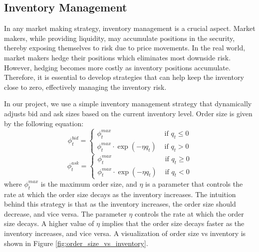 \documentclass[letterpaper, 10 pt, conference]{ieeeconf}  %
\begin{document}
\subsection{Inventory Management}

In any market making strategy, inventory management is a crucial aspect. Market makers, while providing liquidity, may accumulate positions in the security, thereby exposing themselves to risk due to price movements. In the real world, market makers hedge their positions which eliminates most downside risk. However, hedging becomes more costly as inventory positions accumulate. Therefore, it is essential to develop strategies that can help keep the inventory close to zero, effectively managing the inventory risk. 

In our project, we use a simple inventory management strategy that dynamically adjusts bid and ask sizes based on the current inventory level. Order size is given by the following equation: $$\phi_t^{bid} = \begin{cases}
        \phi_t^{max} & \text{ if } q_t \leq 0 \\
        \phi_t^{max} \cdot \exp(-\eta q_t) & \text{ if } q_t > 0
\end{cases} $$
$$ \phi_t^{ask} = \begin{cases}
        \phi_t^{max} & \text{ if } q_t \geq 0 \\
        \phi_t^{max} \cdot \exp(-\eta q_t) & \text{ if } q_t < 0
\end{cases} $$
where $\phi_t^{max}$ is the maximum order size, and $\eta$ is a parameter that controls the rate at which the order size decays as the inventory increases. The intuition behind this strategy is that as the inventory increases, the order size should decrease, and vice versa. The parameter $\eta$ controls the rate at which the order size decays. A higher value of $\eta$ implies that the order size decays faster as the inventory increases, and vice versa. A visualization of order size vs inventory is shown in Figure \ref{fig:order_size_vs_inventory}.
\end{document}
